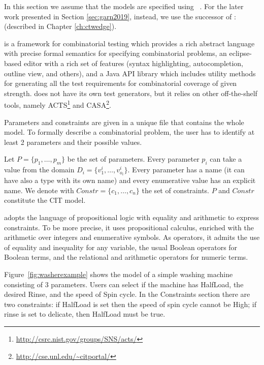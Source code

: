 \begin{tikzborder}{\cite{Gargantini16:validation}}
\begin{tikzborder}{\cite{gargantini_combinatorial_2017}}
In this section we assume that the models are specified using \citlab{}~\cite{citlab12,citlab13ttt}. 
\be
For the later work presented in Section \ref{sec:garn2019}, instead, we use the successor of \citlab{}: \ctwedge (described in Chapter \ref{ch:ctwedge}).

\bb
\citlab{} is a framework for combinatorial testing which provides
a rich abstract language with precise formal semantics for specifying
combinatorial problems, an eclipse-based editor with a rich set of
features (syntax highlighting, autocompletion, outline view, and others),
and a Java API library which includes utility methods for generating
all the test requirements for combinatorial coverage of given
strength. \citlab{} does not have its own test generators, but it
relies on other off-the-shelf tools, namely 
ACTS\footnote{\url{http://csrc.nist.gov/groups/SNS/acts/}} and CASA\footnote{\url{http://cse.unl.edu/~citportal/}}.

Parameters and constraints are given in a unique file
that contains the whole model. To formally describe
a combinatorial problem, the user has to identify at least 2 parameters
and their possible values. 

\begin{defn}\label{def:citmodel2}
	Let $P=\{p_{1},\dots,p_{m}\}$ be the
	set of parameters. Every parameter $p_{i}$ can take a value from the
	domain $D_{i}=\{v_{1}^{i},\ldots,v_{o_{i}}^{i}\}$. Every parameter
	has a name (it can have also a type with its own name) and every
	enumerative value has an explicit name. We denote with $\mathit{Constr}=\{c_{1},\ldots,c_{n}\}$
	the set of constraints. $P$ and $\mathit{Constr}$ constitute the CIT model.
\end{defn}

\citlab{} adopts the language of propositional logic with equality
and arithmetic to express constraints. To be more precise, it uses
propositional calculus, enriched with the arithmetic over integers
and enumerative symbols. As operators, it admits the use of equality
and inequality for any variable, the usual Boolean operators for Boolean
terms, and the relational and arithmetic operators for numeric terms.

Figure~\ref{fig:washerexample} shows the \citlab{} model
of a simple washing machine consisting of 3 parameters. 
Users can select if the machine has \textsf{HalfLoad}, the desired \textsf{Rinse}, and the speed of \textsf{Spin} cycle.
In the \textsf{Constraints} section there are two constraints: if \textsf{HalfLoad} is set then the speed of spin cycle cannot be \textsf{High}; if rinse is set to \textsf{delicate}, then \textsf{HalfLoad} must be true.\be


\end{tikzborder}
\end{tikzborder}
